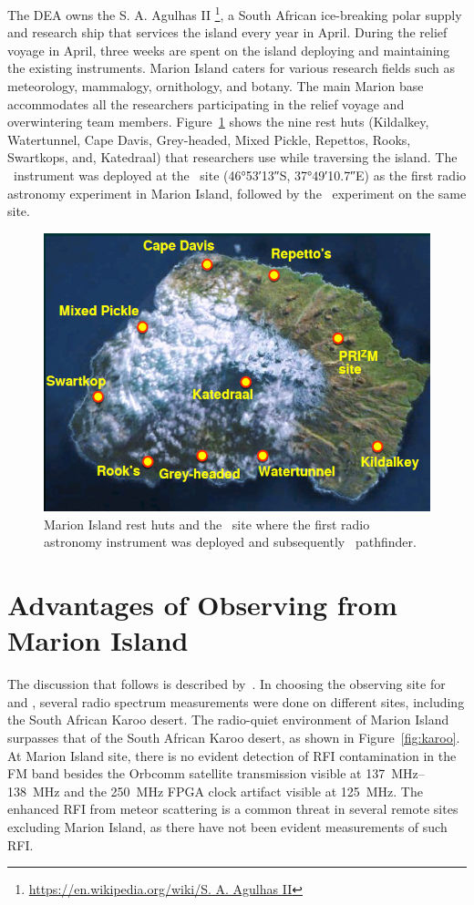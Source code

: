 The DEA owns the S. A. Agulhas II \footnote{\url{https://en.wikipedia.org/wiki/S. A. Agulhas II}}, a South African ice-breaking polar supply and research ship that services the island every year in April. During the relief voyage in April, three weeks are spent on the island deploying and maintaining the existing instruments. Marion Island caters for various research fields such as meteorology, mammalogy, ornithology, and botany. The main Marion base accommodates all the researchers participating in the relief voyage and overwintering team members. Figure~\ref{fig:site} shows the nine rest huts (Kildalkey, Watertunnel, Cape Davis, Grey-headed, Mixed Pickle, Repettos, Rooks, Swartkops, and, Katedraal) that researchers use while traversing the island. The \prizm\ instrument was deployed at the \prizm\ site (\ang{46;53;13}S, \ang{37;49;10.7}E) as the first radio astronomy experiment in Marion Island, followed by the \albatros\ experiment on the same site. 

\begin{figure}
	\centering
	\includegraphics[width=\linewidth]{Figures/site}
	\caption{Marion Island rest huts and the \prizm\ site where the first radio astronomy instrument was deployed and subsequently \albatros\ pathfinder.}
	\label{fig:site}
\end{figure}

\section{Advantages of Observing from Marion Island}

The discussion that follows is described by~\citep{2019JAI.....850004P}. In choosing the observing site for \prizm and \albatros, several radio spectrum measurements were done on different sites, including the South African Karoo desert. The radio-quiet environment of Marion Island surpasses that of the South African Karoo desert, as shown in Figure~\ref{fig:karoo}. At Marion Island site, there is no evident detection of RFI contamination in the FM band besides the Orbcomm satellite transmission visible at \SIrange{137}{138}{\mega\hertz} and the \SI{250}{\mega\hertz} FPGA clock artifact visible at \SI{125}{\mega\hertz}. The enhanced RFI from meteor scattering is a common threat in several remote sites excluding Marion Island, as there have not been evident measurements of such RFI.

